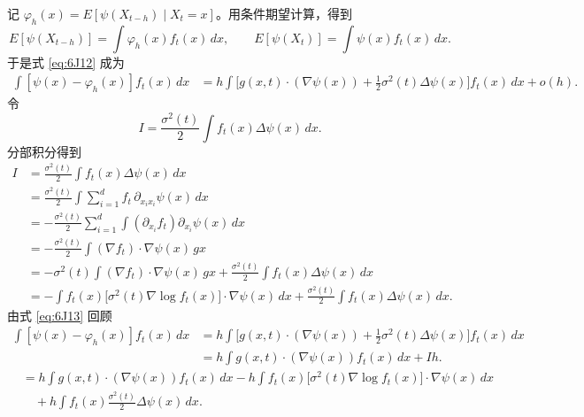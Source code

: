 记 $\varphi_h(x)=E[\psi(X_{t-h})\mid X_t=x]$。用条件期望计算，得到
\[
  E[\psi(X_{t-h})]=\int\varphi_h(x)f_t(x)\,dx,\qquad
  E[\psi(X_t)]=\int\psi(x)f_t(x)\,dx.
\]
于是式 \eqref{eq:6J12} 成为
\begin{equation*}
  \begin{aligned}
   \int[\psi(x)-\varphi_h(x)]f_t(x)\,dx
    &=h\int\bigl[g(x,t)\cdot(\nabla\psi(x))
                +\tfrac12\sigma^2(t)\Delta\psi(x)\bigr]f_t(x)\,dx+o(h).
  \end{aligned}
  \tag{6J13}\label{eq:6J13}
\end{equation*}
令
\[
  I=\frac{\sigma^2(t)}2\int f_t(x)\Delta\psi(x)\,dx.
\]
分部积分得到
\begin{equation*}
  \begin{aligned}
    I&=\frac{\sigma^2(t)}2\int f_t(x)\Delta\psi(x)\,dx\\
     &=\frac{\sigma^2(t)}2\int\sum_{i=1}^d f_t\,\partial_{x_i x_i}\psi(x)\,dx\\
     &=-\frac{\sigma^2(t)}2\sum_{i=1}^d\int(\partial_{x_i}f_t)\partial_{x_i}\psi(x)\,dx\\
     &=-\frac{\sigma^2(t)}2\int(\nabla f_t)\cdot\nabla\psi(x)\,gx\\
     &=-\sigma^2(t)\int(\nabla f_t)\cdot\nabla\psi(x)\,gx
           +\frac{\sigma^2(t)}2\int f_t(x)\Delta\psi(x)\,dx\\
     &=-\int f_t(x)\bigl[\sigma^2(t)\nabla\log f_t(x)\bigr]\cdot\nabla\psi(x)\,dx
           +\frac{\sigma^2(t)}2\int f_t(x)\Delta\psi(x)\,dx .
  \end{aligned}
  \tag{6J14}\label{eq:6J14}
\end{equation*}
由式 \eqref{eq:6J13} 回顾
\begin{equation*}
  \begin{aligned}
   \int[\psi(x)-\varphi_h(x)]f_t(x)\,dx
     &=h\int\bigl[g(x,t)\cdot(\nabla\psi(x))
                   +\tfrac12\sigma^2(t)\Delta\psi(x)\bigr]f_t(x)\,dx\\
     &=h\int g(x,t)\cdot(\nabla\psi(x))f_t(x)\,dx+Ih.
  \end{aligned}
  \tag{6J15}\label{eq:6J15}
\end{equation*}
\begin{equation*}
  \begin{aligned}
   &=h\int g(x,t)\cdot(\nabla\psi(x))f_t(x)\,dx
        -h\int f_t(x)\bigl[\sigma^2(t)\nabla\log f_t(x)\bigr]\cdot\nabla\psi(x)\,dx\\
   &\quad+h\int f_t(x)\frac{\sigma^2(t)}2\Delta\psi(x)\,dx.
  \end{aligned}
  \tag{6J16}\label{eq:6J16}
\end{equation*}
